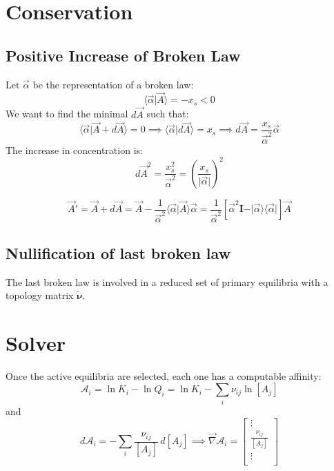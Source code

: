 \documentclass[aps,12pt]{revtex4}
\begin{document}
\section{Conservation}

\subsection{Positive Increase of Broken Law}
Let $\vec \alpha$ be the representation of a broken law:
\begin{equation}
	\langle \vec \alpha \vert \vec A \rangle = - x_s < 0
\end{equation}
We want to find the minimal $d \vec A$ such that:
\begin{equation}
	\langle \vec \alpha \vert \vec A + d\vec A \rangle = 0 \implies \langle \vec \alpha \vert d \vec A \rangle = x_s \implies d \vec A = \dfrac{x_s}{\vec\alpha^2} \vec \alpha
\end{equation}
The increase in concentration is:
\begin{equation}
	d \vec A^2 = \dfrac{x_s^2}{\vec \alpha^2} = \left( \dfrac{x_s}{\vert\vec\alpha\vert}\right) ^2
\end{equation}

\begin{equation}
	\vec A ' = \vec A + d \vec A = \vec{A} - \dfrac{1}{\vec \alpha^2} \langle \vec \alpha \vert \vec A \rangle \vec \alpha 
	= \dfrac{1}{\vec \alpha^2} \left[ \vec \alpha^2 \bm I - \vert \vec \alpha \rangle \langle \vec \alpha \vert \right] \vec A
\end{equation}

\subsection{Nullification of last broken law}
The last broken law is involved in a reduced set of primary equilibria with a topology matrix $\tilde{ \bm \nu}$.
 	
\section{Solver}

Once the active equilibria are selected, each one has a computable 
affinity:
\begin{equation}
\label{eq:affinity}
	\mathcal A_i = \ln K_i - \ln Q_i = \ln K_i -  \sum_{i} \nu_{ij} \ln [A_j] %
\end{equation}
and
\begin{equation}
	d \mathcal A_i = - \sum_i \dfrac{\nu_{ij}}{[A_j]} \, d[A_j] \implies
	 \vec \nabla \mathcal A_i = 
	\begin{bmatrix}
	\vdots\\
	\frac{\nu_{ij}}{[A_j]}\\
	\vdots\\
	\end{bmatrix}
\end{equation}
\end{document}
